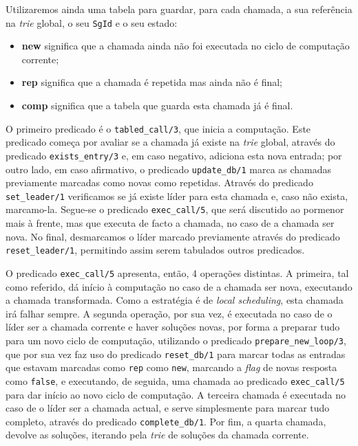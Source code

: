 \documentclass[12pt,a4paper,oneside]{article}
\begin{document}
Utilizaremos ainda uma tabela para guardar, para cada chamada, a sua referência na \textit{trie} global, o seu \texttt{SgId} e o seu estado: 

\begin{itemize}
	\item \textbf{new} significa que a chamada ainda não foi executada no ciclo de computação corrente;
	\item \textbf{rep} significa que a chamada é repetida mas ainda não é final;
	\item \textbf{comp} significa que a tabela que guarda esta chamada já é final.
\end{itemize}

O primeiro predicado é o \texttt{tabled\_call/3}, que inicia a computação. Este predicado começa por avaliar se a chamada já existe na \textit{trie} global, através do predicado \texttt{exists\_entry/3} e, em caso negativo, adiciona esta nova entrada; por outro lado, em caso afirmativo, o predicado \texttt{update\_db/1} marca as chamadas previamente marcadas como novas como repetidas. Através do predicado \texttt{set\_leader/1} verificamos se já existe líder para esta chamada e, caso não exista, marcamo-la. Segue-se o predicado \texttt{exec\_call/5}, que será discutido ao pormenor mais à frente, mas que executa de facto a chamada, no caso de a chamada ser nova. No final, desmarcamos o líder marcado previamente através do predicado \texttt{reset\_leader/1}, permitindo assim serem tabulados outros predicados.

O predicado \texttt{exec\_call/5} apresenta, então, 4 operações distintas. A primeira, tal como referido, dá início à computação no caso de a chamada ser nova, executando a chamada transformada. Como a estratégia é de \textit{local scheduling}, esta chamada irá falhar sempre. A segunda operação, por sua vez, é executada no caso de o líder ser a chamada corrente e haver soluções novas, por forma a preparar tudo para um novo ciclo de computação, utilizando o predicado \texttt{prepare\_new\_loop/3}, que por sua vez faz uso do predicado \texttt{reset\_db/1} para marcar todas as entradas que estavam marcadas como \texttt{rep} como \texttt{new}, marcando a \textit{flag} de novas resposta como \texttt{false}, e executando, de seguida, uma chamada ao predicado \texttt{exec\_call/5} para dar início ao novo ciclo de computação. A terceira chamada é executada no caso de o líder ser a chamada actual, e serve simplesmente para marcar tudo completo, através do predicado \texttt{complete\_db/1}. Por fim, a quarta chamada, devolve as soluções, iterando pela \textit{trie} de soluções da chamada corrente.
\end{document}
